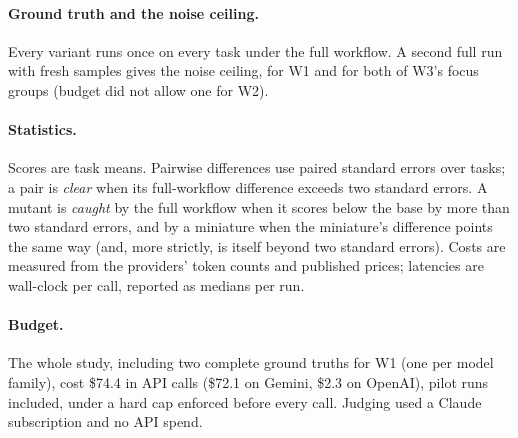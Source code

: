 \paragraph{Ground truth and the noise ceiling.}
Every variant runs once on every task under the full workflow. A second full run with fresh samples
gives the noise ceiling, for W1 and for both of W3's focus groups (budget did not allow one for
W2).

\paragraph{Statistics.}
Scores are task means. Pairwise differences use paired standard errors over tasks; a pair is
\emph{clear} when its full-workflow difference exceeds two standard errors. A mutant is
\emph{caught} by the full workflow when it scores below the base by more than two standard errors,
and by a miniature when the miniature's difference points the same way (and, more strictly, is
itself beyond two standard errors). Costs are measured from the providers' token counts and
published prices; latencies are wall-clock per call, reported as medians per run.

\paragraph{Budget.}
The whole study, including two complete ground truths for W1 (one per model family), cost
\$74.4 in API calls (\$72.1 on Gemini, \$2.3 on OpenAI), pilot runs included, under a hard cap
enforced before every call. Judging used a Claude
subscription and no API spend.
